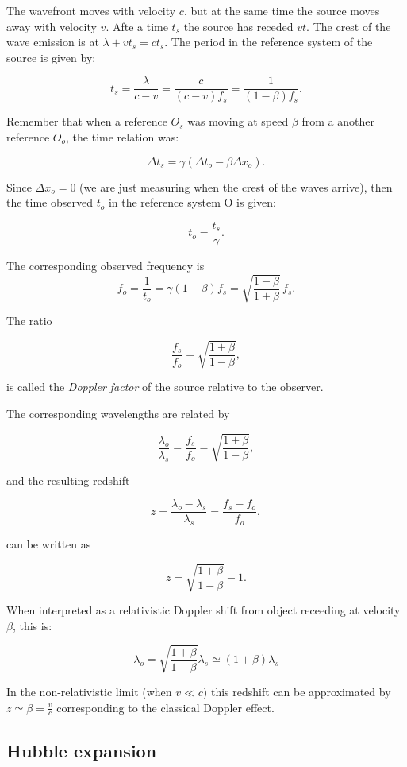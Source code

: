 \documentclass[
  letterpaper,
  DIV=11,
  numbers=noendperiod]{scrreprt}
\begin{document}
The wavefront moves with velocity \(c\), but at the same time the source
moves away with velocity \(v\). Afte a time \(t_s\) the source has
receded \(vt\). The crest of the wave emission is at
\(\lambda+v t_s=ct_s\). The period in the reference system of the source
is given by:

\[t_s = \frac{\lambda}{c-v} = \frac{c}{(c-v)f_s} = \frac{1}{(1-\beta)f_s}.\]

Remember that when a reference \(O_s\) was moving at speed \(\beta\)
from a another reference \(O_{o}\), the time relation was:

\[\Delta t_s = \gamma(\Delta t_{o} - \beta \Delta x_{o}).\]

Since \(\Delta x_{o} =0\) (we are just measuring when the crest of the
waves arrive), then the time observed \(t_{o}\) in the reference system
O is given:

\[t_o = \frac{t_s}{\gamma}.\]

The corresponding observed frequency is
\[f_o = \frac{1}{t_o} = \gamma (1-\beta) f_s = \sqrt{\frac{1-\beta}{1+\beta}}\,f_s.\]

The ratio

\[\frac{f_s}{f_o} = \sqrt{\frac{1+\beta}{1-\beta}},\]

is called the \emph{Doppler factor} of the source relative to the
observer.

The corresponding wavelengths are related by

\[\frac{\lambda_o}{\lambda_s} = \frac{f_s}{f_o} = \sqrt{\frac{1+\beta}{1-\beta}},\]

and the resulting redshift

\[z = \frac{\lambda_o - \lambda_s}{\lambda_s} = \frac{f_s - f_o}{f_o},\]

can be written as

\[z = \sqrt{\frac{1+\beta}{1-\beta}} - 1.\]

When interpreted as a relativistic Doppler shift from object receeding
at velocity \(\beta\), this is:

\[\lambda_o = \sqrt{\frac{1+\beta}{1-\beta}}\lambda_s \simeq (1+\beta)\lambda_s\]

In the non-relativistic limit (when \(v \ll c\)) this redshift can be
approximated by \(z \simeq \beta = \frac{v}{c}\) corresponding to the
classical Doppler effect.

\subsection{Hubble expansion}\label{hubble-expansion}
\end{document}
